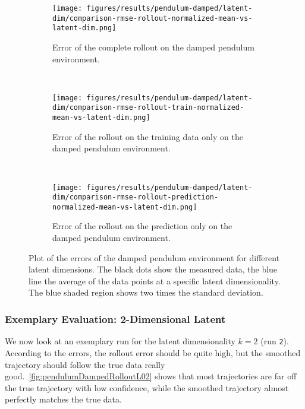 			\begin{figure}
				\centering
				\begin{subfigure}{0.7\linewidth}
					\centering
					\texttt{[image: figures/results/pendulum-damped/latent-dim/comparison-rmse-rollout-normalized-mean-vs-latent-dim.png]}
					\caption[Error of the complete rollout on the damped pendulum environment]{Error of the complete rollout on the damped pendulum environment.}
					\label{fig:pendulumDampedRmseComplete}
				\end{subfigure} \\
				\begin{subfigure}{0.5\linewidth}
					\centering
					\texttt{[image: figures/results/pendulum-damped/latent-dim/comparison-rmse-rollout-train-normalized-mean-vs-latent-dim.png]}
					\caption[Error of the training rollout on the damped pendulum environment]{Error of the rollout on the training data only on the damped pendulum environment.}
					\label{fig:pendulumDampedRmseTrain}
				\end{subfigure}%
				~
				\begin{subfigure}{0.5\linewidth}
					\centering
					\texttt{[image: figures/results/pendulum-damped/latent-dim/comparison-rmse-rollout-prediction-normalized-mean-vs-latent-dim.png]}
					\caption[Error of the prediction rollout on the damped pendulum environment]{Error of the rollout on the prediction only on the damped pendulum environment.}
					\label{fig:pendulumDampedRmsePred}
				\end{subfigure}
				\caption[Errors on the damped pendulum environment for different latent dimensions]{Plot of the errors of the damped pendulum environment for different latent dimensions. The black dots show the measured data, the blue line the average of the data points at a specific latent dimensionality. The blue shaded region shows two times the standard deviation.}
				\label{fig:pendulumDampedRmse}
			\end{figure}

		\subsubsection{Exemplary Evaluation: 2-Dimensional Latent}
			We now look at an exemplary run for the latent dimensionality \( k = 2 \) (run \texttt{2}). According to the errors, the rollout error should be quite high, but the smoothed trajectory should follow the true data really good.~\autoref{fig:pendulumDampedRolloutL02} shows that most trajectories are far off the true trajectory with low confidence, while the smoothed trajectory almost perfectly matches the true data.

